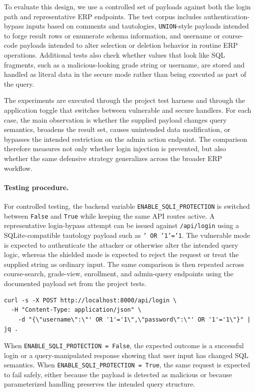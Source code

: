 \documentclass[11pt,a4paper]{article}
\begin{document}
To evaluate this design, we use a controlled set of payloads against both the login path and representative ERP endpoints. The test corpus includes authentication-bypass inputs based on comments and tautologies, \texttt{UNION}-style payloads intended to forge result rows or enumerate schema information, and username or course-code payloads intended to alter selection or deletion behavior in routine ERP operations. Additional tests also check whether values that look like SQL fragments, such as a malicious-looking grade string or username, are stored and handled as literal data in the secure mode rather than being executed as part of the query.

The experiments are executed through the project test harness and through the application toggle that switches between vulnerable and secure handlers. For each case, the main observation is whether the supplied payload changes query semantics, broadens the result set, causes unintended data modification, or bypasses the intended restriction on the admin action endpoint. The comparison therefore measures not only whether login injection is prevented, but also whether the same defensive strategy generalizes across the broader ERP workflow.

\paragraph{Testing procedure.}
For controlled testing, the backend variable \texttt{ENABLE\_SQLI\_PROTECTION} is switched between \texttt{False} and \texttt{True} while keeping the same API routes active. A representative login-bypass attempt can be issued against \texttt{/api/login} using a SQLite-compatible tautology payload such as \texttt{' OR '1'='1}. The vulnerable mode is expected to authenticate the attacker or otherwise alter the intended query logic, whereas the shielded mode is expected to reject the request or treat the supplied string as ordinary input. The same comparison is then repeated across course-search, grade-view, enrollment, and admin-query endpoints using the documented payload set from the project tests.

\begin{verbatim}
curl -s -X POST http://localhost:8000/api/login \
  -H "Content-Type: application/json" \
    -d "{\"username\":\"' OR '1'='1\",\"password\":\"' OR '1'='1\"}" | jq .
\end{verbatim}

When \texttt{ENABLE\_SQLI\_PROTECTION = False}, the expected outcome is a successful login or a query-manipulated response showing that user input has changed SQL semantics. When \texttt{ENABLE\_SQLI\_PROTECTION = True}, the same request is expected to fail safely, either because the payload is detected as malicious or because parameterized handling preserves the intended query structure.
\end{document}
